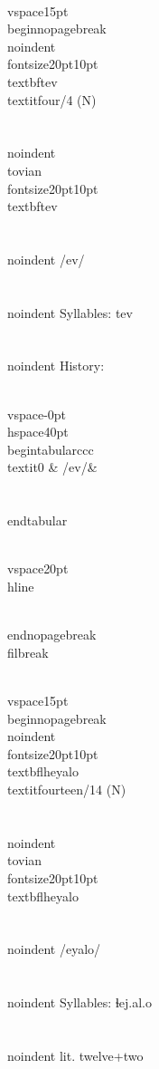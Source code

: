 \\vspace{15pt}
\\begin{nopagebreak}
\\noindent{\\fontsize{20pt}{10pt}\\textbf{tev} } \\textit{four/4} (N)\\\\
\\noindent {\\tovian \\fontsize{20pt}{10pt} \\textbf{tev} }\\\\
\\noindent /{}{\textprimstress}ev/\\\\
\\noindent Syllables: tev\\\\


\\noindent History:

\\vspace{-0pt}
\\hspace{40pt}
\\begin{tabular}{ccc}
\\textit{0} & /{}ev/& \\\\
\\end{tabular}

\\vspace{20pt}\\hline

\\end{nopagebreak}
\\filbreak



\\vspace{15pt}
\\begin{nopagebreak}
\\noindent{\\fontsize{20pt}{10pt}\\textbf{lheyalo} } \\textit{fourteen/14} (N)\\\\
\\noindent {\\tovian \\fontsize{20pt}{10pt} \\textbf{lheyalo} }\\\\
\\noindent /{\textbeltl}ey{\textprimstress}alo/\\\\
\\noindent Syllables: ɬej.al.o\\\\
\\noindent lit. twelve+two\\\\



